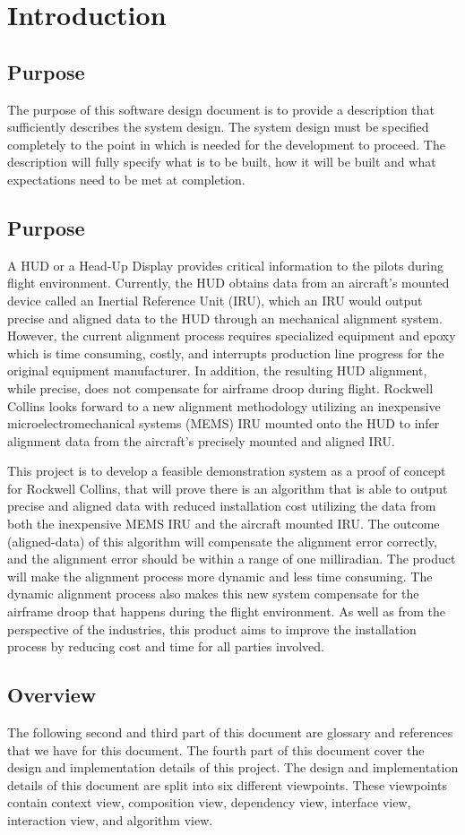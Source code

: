 \section{Introduction}
\subsection{Purpose}
The purpose of this software design document is to provide a description that sufficiently describes the system design. The system design must be specified completely to the point in which is needed for the development to proceed. The description will fully specify what is to be built, how it will be built and what expectations need to be met at completion.

\subsection{Purpose}
A HUD or a Head-Up Display provides critical information to the pilots during flight environment. Currently, the HUD obtains data from an aircraft’s mounted device called an Inertial Reference Unit (IRU), which an IRU would output precise and aligned data to the HUD through an mechanical alignment system. However, the current alignment process requires specialized equipment and epoxy which is time consuming, costly, and interrupts production line progress for the original equipment manufacturer. In addition, the resulting HUD alignment, while precise, does not compensate for airframe droop during flight. Rockwell Collins looks forward to a new alignment methodology utilizing an inexpensive microelectromechanical systems (MEMS) IRU mounted onto the HUD to infer alignment data from the aircraft’s precisely mounted and aligned IRU.

This project is to develop a feasible demonstration system as a proof of concept for Rockwell Collins, that will prove there is an algorithm that is able to output precise and aligned data with reduced installation cost utilizing the data from both the inexpensive MEMS IRU and the aircraft mounted IRU. The outcome (aligned-data) of this algorithm will compensate the alignment error correctly, and the alignment error should be within a range of one milliradian. The product will make the alignment process more dynamic and less time consuming. The dynamic alignment process also makes this new system compensate for the airframe droop that happens during the flight environment. As well as from the perspective of the industries, this product aims to improve the installation process by reducing cost and time for all parties involved.

\subsection{Overview}
The following second and third part of this document are glossary and references that we have for this document. The fourth part of this document cover the design and implementation details of this project. The design and implementation details of this document are split into six different viewpoints. These viewpoints contain context view, composition view, dependency view, interface view, interaction view, and algorithm view. 
